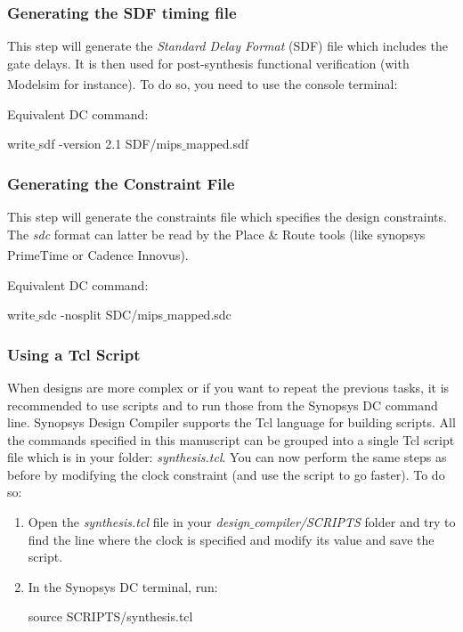 \subsubsection{Generating the SDF timing file}
This step will generate the \textit{Standard Delay Format} (SDF) file which includes the gate delays. It is then used for post-synthesis functional verification (with Modelsim\textsuperscript{\tiny\textregistered} for instance). To do so, you need to use the console terminal:

Equivalent DC command:
\begin{codeline}
write$\_$sdf -version 2.1 SDF/mips$\_$mapped.sdf
\end{codeline}

\subsubsection{Generating the Constraint File}
This step will generate the constraints file which specifies the design constraints. The \textit{sdc} format can latter be read by the Place $\&$ Route tools (like synopsys PrimeTime\textsuperscript{\tiny\textregistered} or Cadence Innovus\textsuperscript{\tiny\textregistered}). 

Equivalent DC command: 
\begin{codeline}
	write$\_$sdc -nosplit SDC/mips$\_$mapped.sdc
\end{codeline}


\subsubsection{Using a Tcl Script}
When designs are more complex or if you want to repeat the previous tasks, it is recommended to use scripts and to run those from the Synopsys DC command line. Synopsys Design Compiler supports the Tcl language for building scripts. All the commands specified in this manuscript can be grouped into a single Tcl script file which is in your folder: \textit{synthesis.tcl}. You can now perform the same steps as before by modifying the clock constraint (and use the script to go faster). To do so:
\begin{enumerate}
	\item Open the \textit{synthesis.tcl} file in your \textit{design$\_$compiler/SCRIPTS} folder and try to find the line where the clock is specified and modify its value and save the script.
	\item In the Synopsys DC terminal, run: 
	\begin{codeline}
		source SCRIPTS/synthesis.tcl
	\end{codeline}

\end{enumerate} 



